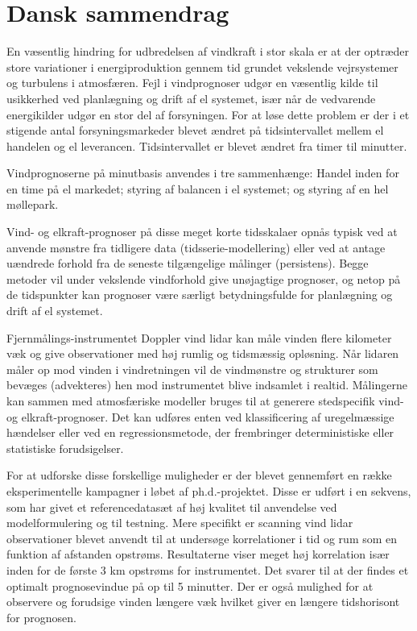 \chapter{Dansk sammendrag}
\label{sec:dansk_sammendrag}


En v{\ae}sentlig hindring for udbredelsen af vindkraft i stor skala er at der optr{\ae}der store variationer i energiproduktion gennem tid grundet vekslende vejrsystemer og turbulens i atmosf{\ae}ren. Fejl i vindprognoser udg{\o}r en v{\ae}sentlig kilde til usikkerhed ved planl{\ae}gning og drift af el systemet, is{\ae}r n{\aa}r de vedvarende energikilder udg{\o}r en stor del af forsyningen. For at l{\o}se dette problem er der i et stigende antal forsyningsmarkeder blevet {\ae}ndret p{\aa} tidsintervallet mellem el handelen og el leverancen. Tidsintervallet er blevet {\ae}ndret fra timer til minutter.

Vindprognoserne p{\aa} minutbasis anvendes i tre sammenh{\ae}nge: Handel inden for en time p{\aa} el markedet; styring af balancen i el systemet; og styring af en hel m{\o}llepark.

Vind- og elkraft-prognoser p{\aa} disse meget korte tidsskalaer opn{\aa}s typisk ved at anvende m{\o}nstre fra tidligere data (tidsserie-modellering) eller ved at antage u{\ae}ndrede forhold fra de seneste tilg{\ae}ngelige m{\aa}linger (persistens). Begge metoder vil under vekslende vindforhold give un{\o}jagtige prognoser, og netop p{\aa} de tidspunkter kan prognoser v{\ae}re s{\ae}rligt betydningsfulde for planl{\ae}gning og drift af el systemet.

Fjernm{\aa}lings-instrumentet Doppler vind lidar kan m{\aa}le vinden flere kilometer v{\ae}k og give observationer med h{\o}j rumlig og tidsm{\ae}ssig opl{\o}sning. N{\aa}r lidaren m{\aa}ler op mod vinden i vindretningen vil de vindm{\o}nstre og strukturer som bev{\ae}ges (advekteres) hen mod instrumentet blive indsamlet i realtid. M{\aa}lingerne kan sammen med atmosf{\ae}riske modeller bruges til at generere stedspecifik vind- og elkraft-prognoser. Det kan udf{\o}res enten ved klassificering af uregelm{\ae}ssige h{\ae}ndelser eller ved en regressionsmetode, der frembringer deterministiske eller statistiske forudsigelser.

For at udforske disse forskellige muligheder er der blevet gennemf{\o}rt en r{\ae}kke eksperimentelle kampagner i l{\o}bet af ph.d.-projektet. Disse er udf{\o}rt i en sekvens, som har givet et referencedatas{\ae}t af h{\o}j kvalitet til anvendelse ved modelformulering og til testning. Mere specifikt er scanning vind lidar observationer blevet anvendt til at unders{\o}ge korrelationer i tid og rum som en funktion af afstanden opstr{\o}ms. Resultaterne viser meget h{\o}j korrelation is{\ae}r inden for de f{\o}rste 3 km opstr{\o}ms for instrumentet. Det svarer til at der findes et optimalt prognosevindue p{\aa} op til 5 minutter. Der er ogs{\aa} mulighed for at observere og forudsige vinden l{\ae}ngere v{\ae}k hvilket giver en l{\ae}ngere tidshorisont for prognosen.

